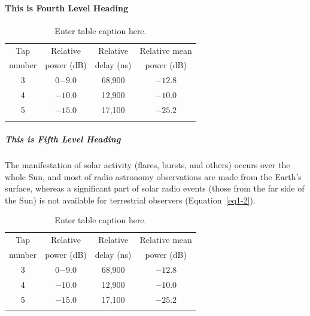 \paragraph{This is Fourth Level Heading}

\lipsum[5]

\begin{table}
\caption{Enter table caption here.\label{tab1-1}}{%
\begin{tabular}{@{}cccc@{}}
\toprule
Tap     &Relative   &Relative   &Relative mean\\
number  &power (dB) &delay (ns) &power (dB)\\
\midrule
3 &0$-9.0$  &68,900\footnotemark[1] &$-12.8$\\
4 &$-10.0$ &12,900\footnotemark[2] &$-10.0$\\
5 &$-15.0$ &17,100 &$-25.2$\\
\botrule
\end{tabular}}{
}
\end{table}

\subparagraph{This is Fifth Level Heading}

\lipsum[6]

The manifestation of solar activity (flares, bursts, and others) occurs over the whole Sun, and most of radio astronomy observations are made from the Earth's surface, whereas a significant part of solar radio events (those from the far side of the Sun) is not available for terrestrial observers (Equation~\ref{eq1-2}).

\begin{table}
\caption{Enter table caption here.\label{tab1-2}}{%
\begin{tabular}{@{}cccc@{}}
\toprule
Tap     &Relative   &Relative   &Relative mean\\
number  &power (dB) &delay (ns) &power (dB)\\
\midrule
3 &0$-9.0$  &68,900\footnotemark[1] &$-12.8$\\
4 &$-10.0$ &12,900\footnotemark[2] &$-10.0$\\
5 &$-15.0$ &17,100 &$-25.2$\\
\botrule
\end{tabular}}{
}
\end{table}

\backmatter


%

